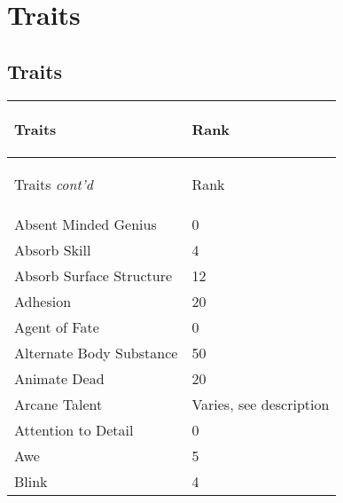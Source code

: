 \documentclass[twoside]{book}
\begin{document}
    

\chapter{Traits}
    
    

\section{Traits}
    
\begin{longtable}{p{1.25in}l} 
  Traits
  &
  \begin{turn}{70}{Rank}\end{turn}
          
  \\
  \hline
  \hline
  \endfirsthead
  Traits \textit{cont'd}
        
  &
  \begin{turn}{70}{Rank}\end{turn}
          
  \\
  \hline
  \endhead
      
  \raggedright
           Absent Minded Genius 
  &
   0 
  \tabularnewline
      
  \raggedright
           Absorb Skill 
  &
   4 
  \tabularnewline
      
  \raggedright
           Absorb Surface Structure
           
  &
   12 
  \tabularnewline
      
  \raggedright
           Adhesion 
  &
   20 
  \tabularnewline
      
  \raggedright
           Agent of Fate 
  &
   0 
  \tabularnewline
      
  \raggedright
           Alternate Body Substance
           
  &
   50 
  \tabularnewline
      
  \raggedright
           Animate Dead 
  &
   20 
  \tabularnewline
      
  \raggedright
           Arcane Talent 
  &
   Varies, see
           description 
  \tabularnewline
      
  \raggedright
           Attention to Detail 
  &
   0 
  \tabularnewline
      
  \raggedright
           Awe 
  &
   5 
  \tabularnewline
      
  \raggedright
           Blink 
  &
   4 
  \tabularnewline
      

\end{longtable}
\end{document}
